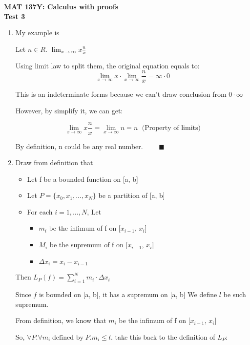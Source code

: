 \documentclass[12pt]{exam}
\begin{document}
{\large
	\begin{center}
		{\bf MAT 137Y: Calculus with proofs}\\
		{\bf Test 3} \\
	\end{center}
}

\begin{enumerate}
	\item My example is 
	
	Let $n \in R$. 
	$\lim_{x \to \infty} x\frac{n}{x}$

	Using limit law to split them, the original equation equals to:  
	$$
	\lim_{x \to \infty} x \cdot  \lim_{x \to \infty} \frac{n}{x} = \infty \cdot 0
	$$


	This is an indeterminate forms because we can't draw conclusion from $0 \cdot \infty$

	However, by simplify it, we can get:

	$$
	\lim_{x \to \infty} x\frac{n}{x} = \lim_{x \to \infty} n = n \; \mbox{ (Property of limits)}
	$$
	
	By definition, n could be any real number. $\qquad \blacksquare$


	\item

	Draw from definition that 
	
	\begin{itemize}
		\item Let f be a bounded function on [a, b]
		\item Let $P = \{x_0,x_1,...,x_N\}$ be a partition of [a, b]
		\item For each $i = 1,...,N$, Let
		\begin{itemize}
			\item $m_i$ be the infimum of f on [$x_{i - 1}$, $x_i$]
			\item $M_i$ be the supremum of f on [$x_{i - 1}$, $x_i$]
			\item $\Delta x_i = x_i - x_{i - 1}$
		\end{itemize}
	\end{itemize}

	
	Then $L_P (f) = \sum_{i = 1}^{N} m_i \cdot \Delta x_i$ 

	Since $f$ is bounded on [a, b], it has a supremum on [a, b]
	We define $l$ be such supremum.

	From definition, we know that $m_i$ be the infimum of f on [$x_{i - 1}$, $x_i$]

	So, $\forall P. \forall m_i \; \mbox{defined by} \; P. m_i \leq l$.
	take this back to the definition of $L_P$:


\end{enumerate}
\end{document}
